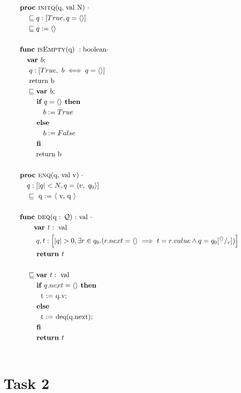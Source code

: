 \documentclass[a4paper]{scrartcl}
\newcommand{\refinedby}{\sqsubseteq} %
\begin{document}
\begin{align*}
& \textbf{proc }\text{\textsc{initq}(q, val N) } \cdot \\ 
    &\quad \refinedby  q : [True, q = \langle \rangle ] \\
    & \quad \refinedby q := \langle \rangle \\\\
& \textbf{func }\text{\textsc{isEmpty}(q) } : \text{boolean} \cdot  \\ 
	& \quad \textbf{var } b; \\
	& \quad ~ q : [True,~b \iff q = \langle \rangle  ] \\
	& \quad \text{ return b} \\
	& \quad \refinedby \textbf{var } b; \\
	& \quad \quad \textbf{ if } q = \langle \rangle \textbf{ then} \\
		& \quad \quad \quad ~ b := True \\
	& \quad \quad \textbf{ else} \\
		& \quad \quad \quad  ~ b := False \\
	& \quad \quad\textbf{ fi} \\
	& \quad \quad\text{ return b} \\\\
& \textbf{proc }\text{\textsc{enq}(q, val v) } \cdot\\
	& \quad q : \left[|q| < N, q = \langle v,~q_0 \rangle \right] \\
    & \quad \refinedby \text{ q := $\langle$ v, q $\rangle$}\\\\
& \textbf{func }\text{\textsc{deq}(q : $\mathcal{Q}$) :} \text{ val } \cdot \\
    & \quad \quad \textbf{var }t : \text{ val} \\
	& \quad \quad ~q, t : \left[ |q| > 0, \exists r \in q_0.( r.next = \langle \rangle \implies t = r.value \land q = q_0[^{\langle \rangle}/_r]) \right] \\
    & \quad \quad \textbf{ return } t \\\\
    & \quad \refinedby \textbf{var }t : \text{ val} \\
    & \quad \quad \textbf{ if } q.next = \langle \rangle \textbf{ then} \\
		& \quad \quad \quad \text{t := q.v;} \\
    & \quad \quad \textbf{ else} \\
		& \quad \quad \quad \text{t := deq(q.next);} \\
    & \quad \quad \textbf{ fi} \\
    & \quad \quad \textbf{ return } t \\\\
\end{align*}

\section*{Task 2}
\end{document}
